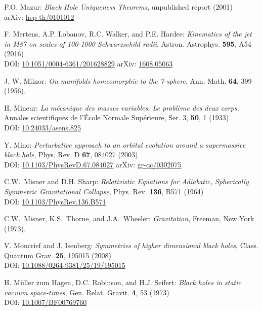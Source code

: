 \begin{thebibliography}{123}
P.O. Mazur:
{\em Black Hole Uniqueness Theorems},
unpublished report (2001)\\
arXiv: \href{https://arxiv.org/abs/hep-th/0101012}{hep-th/0101012}

F. Mertens, A.P. Lobanov, R.C. Walker, and P.E. Hardee:
{\em Kinematics of the jet in M87 on scales of 100-1000 Schwarzschild radii},
Astron. Astrophys. {\bf 595}, A54 (2016)\\
DOI: \href{https://doi.org/10.1051/0004-6361/201628829}{10.1051/0004-6361/201628829}\hfill
arXiv: \href{https://arxiv.org/abs/1608.05063}{1608.05063}

J. W. Milnor: {\em On manifolds homeomorphic to the 7-sphere},
Ann. Math. {\bf 64}, 399 (1956).

H. Mineur: {\em La mécanique des masses variables. Le problème des deux corps},
Annales scientifiques de l'École Normale Supérieure, Ser. 3, {\bf 50}, 1 (1933)\\
DOI: \href{https://doi.org/10.24033/asens.825}{10.24033/asens.825}

Y. Mino:
{\em Perturbative approach to an orbital evolution around a supermassive black hole},
Phys. Rev. D {\bf 67}, 084027 (2003)\\
DOI: \href{https://doi.org/10.1103/PhysRevD.67.084027}{10.1103/PhysRevD.67.084027}\hfill
arXiv: \href{https://arxiv.org/abs/gr-qc/0302075}{gr-qc/0302075}

C.W.~Misner and D.H. Sharp:
{\em Relativistic Equations for Adiabatic, Spherically Symmetric Gravitational Collapse},
Phys. Rev. {\bf 136}, B571 (1964)\\
DOI: \href{https://doi.org/10.1103/PhysRev.136.B571}{10.1103/PhysRev.136.B571}

C.W.~Misner, K.S.~Thorne, and J.A.~Wheeler:
{\em Gravitation},
Freeman, New York (1973).

V. Moncrief and J. Isenberg:
{\em Symmetries of higher dimensional black holes},
Class. Quantum Grav. {\bf 25}, 195015 (2008)\\
DOI: \href{https://doi.org/10.1088/0264-9381/25/19/195015}{10.1088/0264-9381/25/19/195015}

H. Müller zum Hagen, D.C. Robinson, and H.J. Seifert:
{\em Black holes in static vacuum space-times},
Gen. Relat. Gravit. {\bf 4}, 53 (1973)\\
DOI: \href{https://doi.org/10.1007/BF00769760}{10.1007/BF00769760}


\end{thebibliography}
